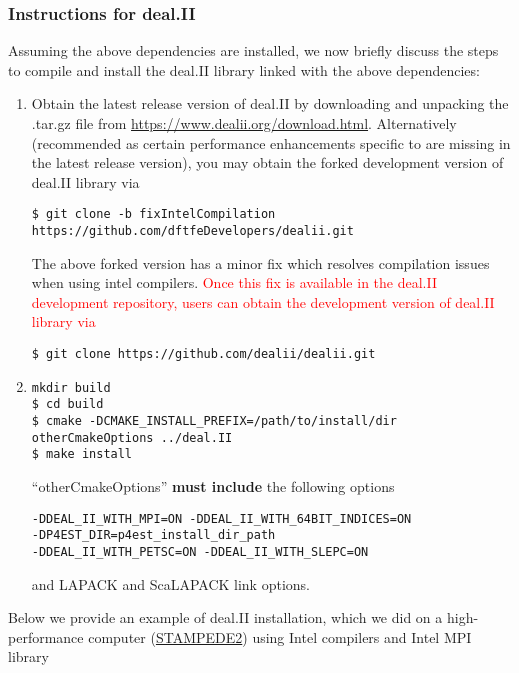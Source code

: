\subsubsection{Instructions for deal.II}
Assuming the above dependencies are installed, we now briefly discuss the steps to compile and install the deal.II library linked with the above dependencies:
\begin{enumerate}

\item Obtain the latest release version of deal.II by downloading and unpacking the .tar.gz file from \url{https://www.dealii.org/download.html}. Alternatively (recommended as certain performance enhancements specific to \dftfe{} are missing in the latest release version), you may obtain the forked development version of deal.II library via
\begin{verbatim}
$ git clone -b fixIntelCompilation https://github.com/dftfeDevelopers/dealii.git
\end{verbatim}
The above forked version has a minor fix which resolves compilation issues when using intel compilers. \textcolor{red}{Once this fix is available in the deal.II development repository, users can obtain the development version of deal.II library via}
\begin{verbatim}
$ git clone https://github.com/dealii/dealii.git
\end{verbatim}
 

\item
\begin{verbatim}
mkdir build
$ cd build
$ cmake -DCMAKE_INSTALL_PREFIX=/path/to/install/dir otherCmakeOptions ../deal.II
$ make install
\end{verbatim}
``otherCmakeOptions'' {\bf must include} the following options
\begin{verbatim}
-DDEAL_II_WITH_MPI=ON -DDEAL_II_WITH_64BIT_INDICES=ON
-DP4EST_DIR=p4est_install_dir_path
-DDEAL_II_WITH_PETSC=ON -DDEAL_II_WITH_SLEPC=ON
\end{verbatim}
and LAPACK and ScaLAPACK link options. 
\end{enumerate}		
Below we provide an example of deal.II installation, which we did on a high-performance computer (\href{https://www.tacc.utexas.edu/systems/stampede2}{STAMPEDE2}) using Intel compilers and Intel MPI library

